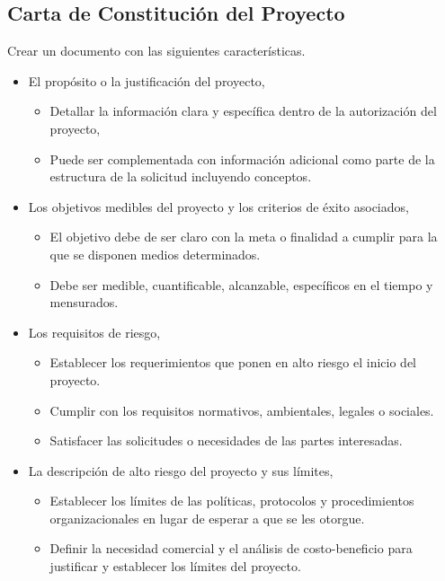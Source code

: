 \documentclass[letterpaper,12pt,openright,oneside]{article}
\theoremstyle{plain}
\begin{document}
\subsection*{Carta de Constitución del Proyecto}

Crear un documento con las siguientes características.

\begin{itemize}
    \item El propósito o la justificación del proyecto, 
        \begin{itemize}
            \item Detallar la información clara y específica dentro de la autorización del proyecto, 
            \item Puede ser complementada con información adicional como parte de la estructura de la solicitud incluyendo conceptos.
        \end{itemize}
    \item Los objetivos medibles del proyecto y los criterios de éxito asociados,
        \begin{itemize}
            \item El objetivo debe de ser claro con la meta o finalidad a cumplir para la que se disponen medios determinados.
            \item Debe ser medible, cuantificable, alcanzable, específicos en el tiempo y mensurados.
        \end{itemize}
    \item Los requisitos de riesgo,
        \begin{itemize}
            \item Establecer los requerimientos que ponen en alto riesgo el inicio del proyecto.
            \item Cumplir con los requisitos normativos, ambientales, legales o sociales.
            \item Satisfacer las solicitudes o necesidades de las partes interesadas.
        \end{itemize}
    \item La descripción de alto riesgo del proyecto y sus límites,
        \begin{itemize}
            \item Establecer los límites de las políticas, protocolos y procedimientos organizacionales en lugar de esperar a que se les otorgue.
            \item Definir la necesidad comercial y el análisis de costo-beneficio para justificar y establecer los límites del proyecto.

\end{itemize}
\end{itemize}
\end{document}
